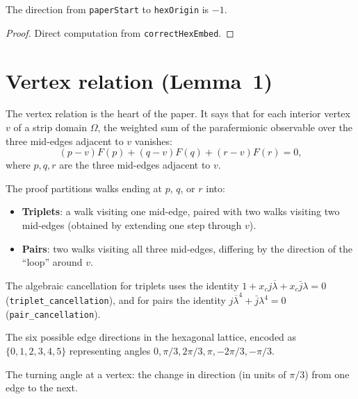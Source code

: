 \begin{lemma}
\begin{lemma}\label{lem:starting_dir}
\leanok
  The direction from \texttt{paperStart} to \texttt{hexOrigin} is $-1$.
\end{lemma}
\begin{proof}
\leanok
  Direct computation from \texttt{correctHexEmbed}.
\end{proof}

\section{Vertex relation (Lemma~1)}\label{sec:vertex_rel}

The vertex relation is the heart of the paper. It says that for each
interior vertex $v$ of a strip domain $\Omega$, the weighted sum of the
parafermionic observable over the three mid-edges adjacent to $v$ vanishes:
\begin{equation}\label{eq:vertex_rel}
  (p-v)F(p) + (q-v)F(q) + (r-v)F(r) = 0,
\end{equation}
where $p, q, r$ are the three mid-edges adjacent to $v$.

The proof partitions walks ending at $p$, $q$, or $r$ into:
\begin{itemize}
\item \textbf{Triplets}: a walk visiting one mid-edge, paired with two
  walks visiting two mid-edges (obtained by extending one step through $v$).
\item \textbf{Pairs}: two walks visiting all three mid-edges, differing
  by the direction of the ``loop'' around $v$.
\end{itemize}

The algebraic cancellation for triplets uses the identity
$1 + x_c j \overline{\lambda} + x_c \bar{j} \lambda = 0$
(\texttt{triplet\_cancellation}), and for pairs the identity
$j \overline{\lambda}^4 + \bar{j} \lambda^4 = 0$
(\texttt{pair\_cancellation}).

\begin{definition}\label{def:hex_edge_dir}
\leanok
  The six possible edge directions in the hexagonal lattice,
  encoded as $\{0,1,2,3,4,5\}$ representing angles
  $0, \pi/3, 2\pi/3, \pi, -2\pi/3, -\pi/3$.
\end{definition}

\begin{definition}\label{def:hex_turn}
\leanok
{}
  The turning angle at a vertex: the change in direction
  (in units of $\pi/3$) from one edge to the next.
\end{definition}


\end{lemma}
